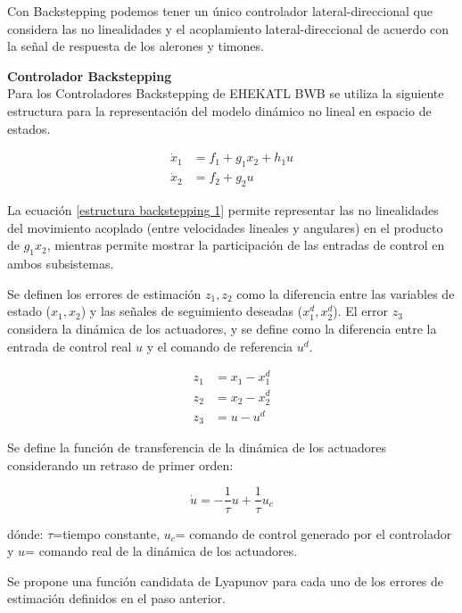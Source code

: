 Con Backstepping podemos tener un único controlador lateral-direccional que considera las no linealidades y el acoplamiento lateral-direccional de acuerdo con la señal de respuesta de los alerones y timones. 

\medskip

\textbf{Controlador Backstepping}\\
Para los Controladores Backstepping de EHEKATL BWB se utiliza la siguiente estructura para la representación del modelo dinámico no lineal en espacio de estados.

\begin{align}
\label{estructura backstepping 1}
    \dot x_{1} &= f_{1} + g_1 x_2 + h_1 u \\ \nonumber
    \dot x_{2} &= f_{2} + g_2 u
\end{align}

La ecuación \ref{estructura backstepping 1} permite representar las no linealidades del movimiento acoplado (entre velocidades lineales y angulares) en el producto de $g_1 x_2$, mientras permite mostrar la participación de las entradas de control en ambos subsistemas. 

Se definen los errores de estimación $z_1, z_2$ como la diferencia entre las variables de estado ($x_1, x_2$) y las señales de seguimiento deseadas ($x_1^d, x_2^d$). El error $z_3$ considera la dinámica de los actuadores, y se define como la diferencia entre la entrada de control real $u$ y el comando de referencia $u^d$.

\begin{align}
    z_1 &= x_1 - x^d_1 \\
    z_2 &= x_2 - x^d_2 \\
    z_3 &= u - u^d
\end{align}

Se define la función de transferencia de la dinámica de los actuadores considerando un retraso de primer orden: 

\begin{equation}
    \dot u = - \frac{1}{\tau}u + \frac{1}{\tau} u_c
\end{equation}

dónde: $\tau$=tiempo constante, $u_{c}$= comando de control generado por el controlador y $u$= comando real de la dinámica de los actuadores. 

Se propone una función candidata de Lyapunov para cada uno de los errores de estimación definidos en el paso anterior.

